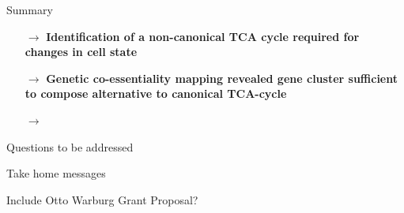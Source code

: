 \documentclass[10pt, aspectratio=169]{beamer}
\begin{document}
\begin{frame}{Summary}
\begin{itemize}
    \item[$\rightarrow$] \textbf{Identification of a non-canonical TCA cycle required for changes in cell state} \\[0.3cm]
    \item[$\rightarrow$] \textbf{Genetic co-essentiality mapping revealed gene cluster sufficient to compose alternative to canonical TCA-cycle}
    \item[$\rightarrow$] \textbf{}
\end{itemize}
\end{frame}

\begin{frame}{Questions to be addressed}

\end{frame}

\begin{frame}{Take home messages}

Include Otto Warburg Grant Proposal?
\end{frame}
\end{document}
